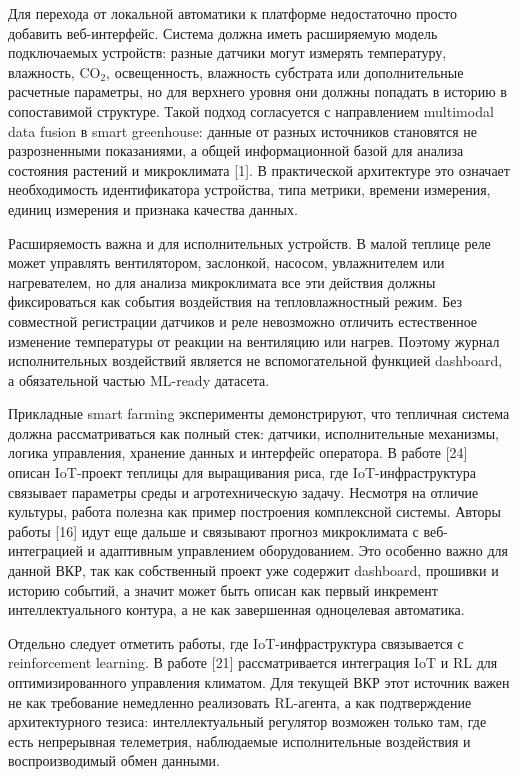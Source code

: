 \documentclass[a4paper,14pt]{extarticle}
\begin{document}
Для перехода от локальной автоматики к платформе недостаточно просто
добавить веб-интерфейс. Система должна иметь расширяемую модель
подключаемых устройств: разные датчики могут измерять температуру,
влажность, CO\(_2\), освещенность, влажность субстрата или
дополнительные расчетные параметры, но для верхнего уровня они должны
попадать в историю в сопоставимой структуре. Такой подход согласуется с
направлением multimodal data fusion в smart greenhouse: данные от разных
источников становятся не разрозненными показаниями, а общей
информационной базой для анализа состояния растений и микроклимата
{[}1{]}. В практической архитектуре это означает необходимость
идентификатора устройства, типа метрики, времени измерения, единиц
измерения и признака качества данных.

Расширяемость важна и для исполнительных устройств. В малой теплице реле
может управлять вентилятором, заслонкой, насосом, увлажнителем или
нагревателем, но для анализа микроклимата все эти действия должны
фиксироваться как события воздействия на тепловлажностный режим. Без
совместной регистрации датчиков и реле невозможно отличить естественное
изменение температуры от реакции на вентиляцию или нагрев. Поэтому
журнал исполнительных воздействий является не вспомогательной функцией
dashboard, а обязательной частью ML-ready датасета.

Прикладные smart farming эксперименты демонстрируют, что тепличная
система должна рассматриваться как полный стек: датчики, исполнительные
механизмы, логика управления, хранение данных и интерфейс оператора. В
работе {[}24{]} описан IoT-проект теплицы для выращивания риса, где
IoT-инфраструктура связывает параметры среды и агротехническую задачу.
Несмотря на отличие культуры, работа полезна как пример построения
комплексной системы. Авторы работы {[}16{]} идут еще дальше и связывают
прогноз микроклимата с веб-интеграцией и адаптивным управлением
оборудованием. Это особенно важно для данной ВКР, так как собственный
проект уже содержит dashboard, прошивки и историю событий, а значит
может быть описан как первый инкремент интеллектуального контура, а не
как завершенная одноцелевая автоматика.

Отдельно следует отметить работы, где IoT-инфраструктура связывается с
reinforcement learning. В работе {[}21{]} рассматривается интеграция IoT
и RL для оптимизированного управления климатом. Для текущей ВКР этот
источник важен не как требование немедленно реализовать RL-агента, а как
подтверждение архитектурного тезиса: интеллектуальный регулятор возможен
только там, где есть непрерывная телеметрия, наблюдаемые исполнительные
воздействия и воспроизводимый обмен данными.
\end{document}
